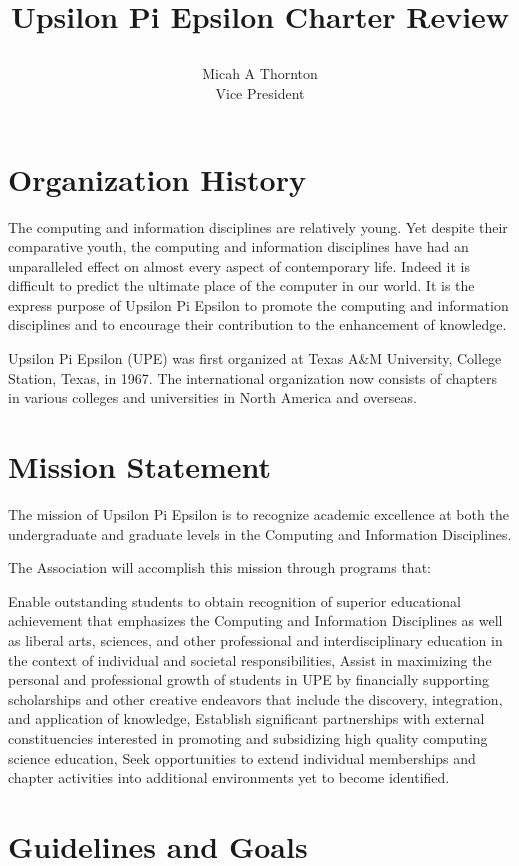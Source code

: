 \documentclass{article}
\title{\author{Micah A Thornton\\ Vice President}Upsilon Pi Epsilon Charter Review}
\begin{document}
\maketitle{}
\section{Organization History}

The computing and information disciplines are relatively young. Yet despite their comparative youth, the computing and information disciplines have had an unparalleled effect on almost every aspect of contemporary life. Indeed it is difficult to predict the ultimate place of the computer in our world.  It is the express purpose of Upsilon Pi Epsilon to promote the computing and information disciplines and to encourage their contribution to the enhancement of knowledge.

Upsilon Pi Epsilon (UPE) was first organized at Texas A\&M University, College Station, Texas, in 1967. The international organization now consists of chapters in various colleges and universities in North America and overseas.

\section{Mission Statement}

The mission of Upsilon Pi Epsilon is to recognize academic excellence at both the undergraduate and graduate levels in the Computing and Information Disciplines.

The Association will accomplish this mission through programs that:

    Enable outstanding students to obtain recognition of superior educational achievement that emphasizes the Computing and Information Disciplines as well as liberal arts, sciences, and other professional and interdisciplinary education in the context of individual and societal responsibilities,
    Assist in maximizing the personal and professional growth of students in UPE by financially supporting scholarships and other creative endeavors that include the discovery, integration, and application of knowledge,
    Establish significant partnerships with external constituencies interested in promoting and subsidizing high quality computing science education,
    Seek opportunities to extend individual memberships and chapter activities into additional environments yet to become identified.

\section{Guidelines and Goals}
\end{document}
